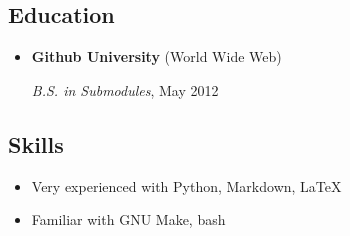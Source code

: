 \documentclass[]{article}
\begin{document}
\subsection{Education}\label{education}

\begin{itemize}
\item
  \textbf{Github University} (World Wide Web)

  \emph{B.S. in Submodules}, May 2012
\end{itemize}

\subsection{Skills}\label{skills}

\begin{itemize}
\item
  Very experienced with Python, Markdown, \LaTeX
\item
  Familiar with GNU Make, bash
\end{itemize}
\end{document}
